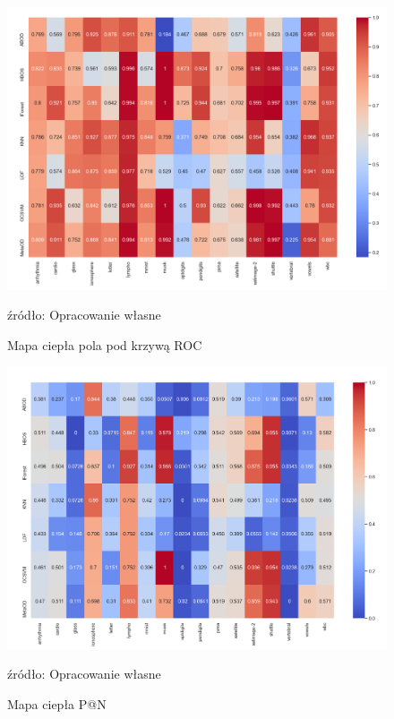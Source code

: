 \begin{figure}
    \centering
    \includegraphics[width = \textwidth]{chapters/analiza/img/roc.png}
    \caption{Mapa ciepła pola pod krzywą ROC}
    \footnotesize{źródło: Opracowanie własne }
    \label{fig:h1}
\end{figure}


\begin{figure}
    \centering
    \includegraphics[width =\textwidth]{chapters/analiza/img/prc.png}
    \caption{Mapa ciepła P@N}
    \footnotesize{źródło: Opracowanie własne }
    \label{fig:h2}
 \end{figure}

